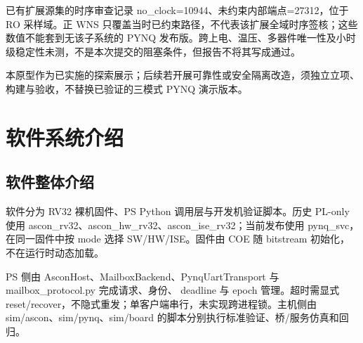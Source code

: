 已有扩展源集的时序审查记录 no\_clock=10944、未约束内部端点=27312，位于 RO 采样域。正 WNS 只覆盖当时已约束路径，不代表该扩展全域时序签核；这些数值不能套到无该子系统的 PYNQ 发布版。跨上电、温压、多器件唯一性及小时级稳定性未测，不是本次提交的阻塞条件，但报告不将其写成通过。

本原型作为已实施的探索展示；后续若开展可靠性或安全隔离改造，须独立立项、构建与验收，不替换已验证的三模式 PYNQ 演示版本。


\Needspace{85pt}

\section{软件系统介绍}

\Needspace{85pt}

\subsection{软件整体介绍}

软件分为 RV32 裸机固件、PS Python 调用层与开发机验证脚本。历史 PL-only 使用 ascon\_rv32、ascon\_hw\_rv32、ascon\_ise\_rv32；当前发布使用 pynq\_svc，在同一固件中按 mode 选择 SW/HW/ISE。固件由 COE 随 bitstream 初始化，不在运行时动态加载。

PS 侧由 AsconHost、MailboxBackend、PynqUartTransport 与 mailbox\_protocol.py 完成请求、身份、 deadline 与 epoch 管理。超时需显式 reset/recover，不隐式重发；单客户端串行，未实现跨进程锁。主机侧由 sim/ascon、sim/pynq、sim/board 的脚本分别执行标准验证、桥/服务仿真和回归。


